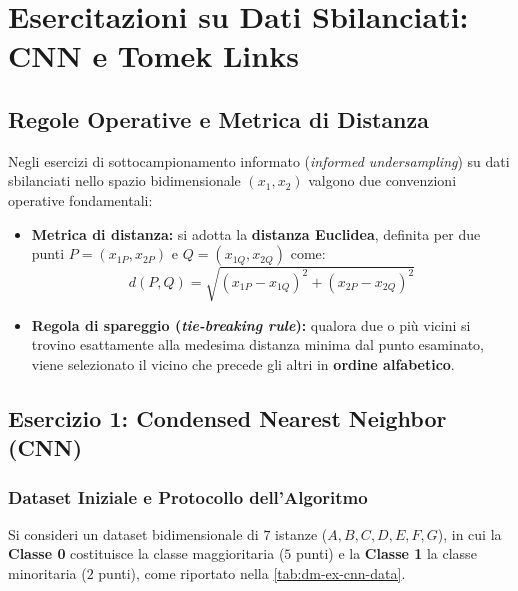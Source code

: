 \FloatBarrier
\section{Esercitazioni su Dati Sbilanciati: CNN e Tomek Links}
\label{ch:dm-ex-imbalanced-cnn-tomek}

\subsection{Regole Operative e Metrica di Distanza}
\label{sec:dm-ex-imb-rules}

Negli esercizi di sottocampionamento informato (\textit{informed undersampling}) su dati sbilanciati nello spazio bidimensionale $(x_1, x_2)$ valgono due convenzioni operative fondamentali:
\begin{itemize}
    \item \textbf{Metrica di distanza:} si adotta la \textbf{distanza Euclidea}, definita per due punti $P = (x_{1P}, x_{2P})$ e $Q = (x_{1Q}, x_{2Q})$ come:
    \begin{equation}
        d(P, Q) = \sqrt{(x_{1P} - x_{1Q})^2 + (x_{2P} - x_{2Q})^2}
    \end{equation}
    \item \textbf{Regola di spareggio (\textit{tie-breaking rule}):} qualora due o pi\`u vicini si trovino esattamente alla medesima distanza minima dal punto esaminato, viene selezionato il vicino che precede gli altri in \textbf{ordine alfabetico}.
\end{itemize}

\FloatBarrier
\subsection{Esercizio 1: Condensed Nearest Neighbor (CNN)}
\label{sec:dm-ex-cnn}

\FloatBarrier
\subsubsection{Dataset Iniziale e Protocollo dell'Algoritmo}
\label{subsec:dm-ex-cnn-setup}

Si consideri un dataset bidimensionale di $7$ istanze ($A, B, C, D, E, F, G$), in cui la \textbf{Classe 0} costituisce la classe maggioritaria ($5$ punti) e la \textbf{Classe 1} la classe minoritaria ($2$ punti), come riportato nella \autoref{tab:dm-ex-cnn-data}.


